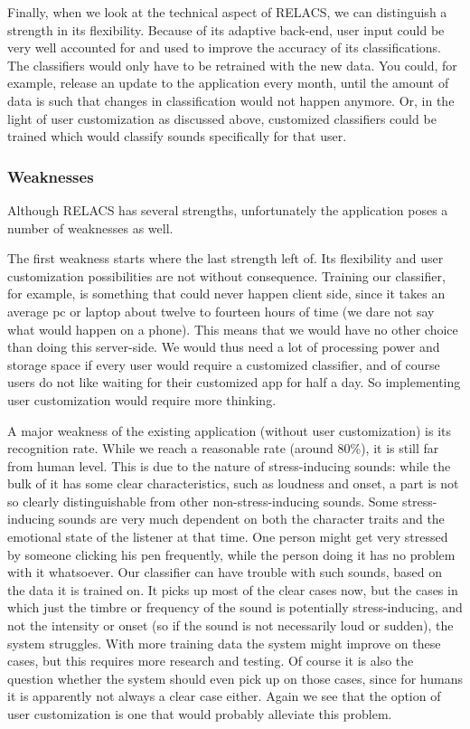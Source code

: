 \documentclass[a4paper]{article}
\begin{document}
Finally, when we look at the technical aspect of RELACS, we can distinguish a strength in its flexibility. Because of its adaptive back-end, user input could be very well accounted for and used to improve the accuracy of its classifications. The classifiers would only have to be retrained with the new data. You could, for example, release an update to the application every month, until the amount of data is such that changes in classification would not happen anymore. Or, in the light of user customization as discussed above, customized classifiers could be trained which would classify sounds specifically for that user.

\subsubsection{Weaknesses}
Although RELACS has several strengths, unfortunately the application poses a number of weaknesses as well.

The first weakness starts where the last strength left of. Its flexibility and user customization possibilities are not without consequence. Training our classifier, for example, is something that could never happen client side, since it takes an average pc or laptop about twelve to fourteen hours of time (we dare not say what would happen on a phone). This means that we would have no other choice than doing this server-side. We would thus need a lot of processing power and storage space if every user would require a customized classifier, and of course users do not like waiting for their customized app for half a day. So implementing user customization would require more thinking.

A major weakness of the existing application (without user customization) is its recognition rate. While we reach a reasonable rate (around 80\%), it is still far from human level. This is due to the nature of stress-inducing sounds: while the bulk of it has some clear characteristics, such as loudness and onset, a part is not so clearly distinguishable from other non-stress-inducing sounds. Some stress-inducing sounds are very much dependent on both the character traits and the emotional state of the listener at that time. One person might get very stressed by someone clicking his pen frequently, while the person doing it has no problem with it whatsoever. Our classifier can have trouble with such sounds, based on the data it is trained on. It picks up most of the clear cases now, but the cases in which just the timbre or frequency of the sound is potentially stress-inducing, and not the intensity or onset (so if the sound is not necessarily loud or sudden), the system struggles. With more training data the system might improve on these cases, but this requires more research and testing. Of course it is also the question whether the system should even pick up on those cases, since for humans it is apparently not always a clear case either. Again we see that the option of user customization is one that would probably alleviate this problem.
\end{document}
